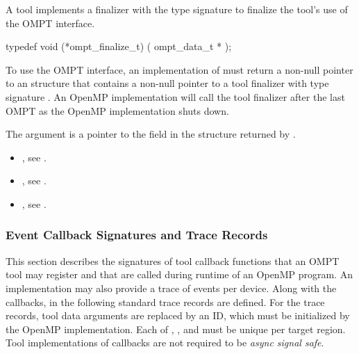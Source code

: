 \label{sec:ompt_finalize_t}

\summary
A tool implements a finalizer with the type signature  
to finalize the tool's use of the OMPT interface.

\format

\begin{ccppspecific}
\begin{omptInquiry}
typedef void (*ompt_finalize_t) (
  ompt_data_t *
);
\end{omptInquiry}
\end{ccppspecific}


\descr
To use the OMPT interface, an implementation of must return 
a non-null pointer to an  structure that contains a
non-null pointer to a tool finalizer with type signature .
An OpenMP implementation will call the tool finalizer after the last OMPT 
 as the OpenMP implementation shuts down.

\argdesc
The  argument is a pointer to the  field in 
the  structure returned by .

\crossreferences
\begin{itemize}
\item {}, see
.

\item {}, see .

\item {}, see .
\end{itemize}



\subsubsection{Event Callback Signatures and Trace Records}
\label{sec:ToolsSupport_callback_signatures}

This section describes the signatures of tool callback functions that an OMPT
tool may register and that are called during runtime of an OpenMP program. An 
implementation may also provide a trace of events per device. Along with the 
callbacks, in the following standard trace records are defined. For the trace 
records, tool data arguments are replaced by an ID, which must be initialized 
by the OpenMP implementation. Each of , , and 
 must be unique per target region. Tool implementations of 
callbacks are not required to be \emph{async signal safe}.

